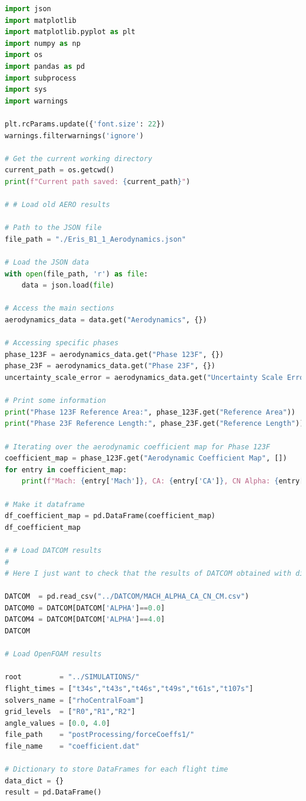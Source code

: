 \documentclass[12pt]{article}
\begin{document}
\begin{lstlisting}[language=Python, caption=Python script used to post-process numerical solutions. To report bugs email to: lorenzo.campoli@gspace.com, label=lst:pp]
import json
import matplotlib
import matplotlib.pyplot as plt
import numpy as np
import os
import pandas as pd
import subprocess
import sys
import warnings

plt.rcParams.update({'font.size': 22})
warnings.filterwarnings('ignore')

# Get the current working directory
current_path = os.getcwd()
print(f"Current path saved: {current_path}")

# # Load old AERO results

# Path to the JSON file
file_path = "./Eris_B1_1_Aerodynamics.json"

# Load the JSON data
with open(file_path, 'r') as file:
    data = json.load(file)

# Access the main sections
aerodynamics_data = data.get("Aerodynamics", {})

# Accessing specific phases
phase_123F = aerodynamics_data.get("Phase 123F", {})
phase_23F = aerodynamics_data.get("Phase 23F", {})
uncertainty_scale_error = aerodynamics_data.get("Uncertainty Scale Error", {})

# Print some information
print("Phase 123F Reference Area:", phase_123F.get("Reference Area"))
print("Phase 23F Reference Length:", phase_23F.get("Reference Length"))

# Iterating over the aerodynamic coefficient map for Phase 123F
coefficient_map = phase_123F.get("Aerodynamic Coefficient Map", [])
for entry in coefficient_map:
    print(f"Mach: {entry['Mach']}, CA: {entry['CA']}, CN Alpha: {entry['CN Alpha']}")

# Make it dataframe
df_coefficient_map = pd.DataFrame(coefficient_map)
df_coefficient_map

# # Load DATCOM results
# 
# Here I just want to check that the results of DATCOM obtained with different flight conditions (FLTCON) are reasonably similar.

DATCOM  = pd.read_csv("../DATCOM/MACH_ALPHA_CA_CN_CM.csv")
DATCOM0 = DATCOM[DATCOM['ALPHA']==0.0]
DATCOM4 = DATCOM[DATCOM['ALPHA']==4.0]
DATCOM

# Load OpenFOAM results

root         = "../SIMULATIONS/"
flight_times = ["t34s","t43s","t46s","t49s","t61s","t107s"]
solvers_name = ["rhoCentralFoam"]
grid_levels  = ["R0","R1","R2"]
angle_values = [0.0, 4.0]
file_path    = "postProcessing/forceCoeffs1/" 
file_name    = "coefficient.dat"

# Dictionary to store DataFrames for each flight time
data_dict = {}
result = pd.DataFrame()


\end{lstlisting}
\end{document}

